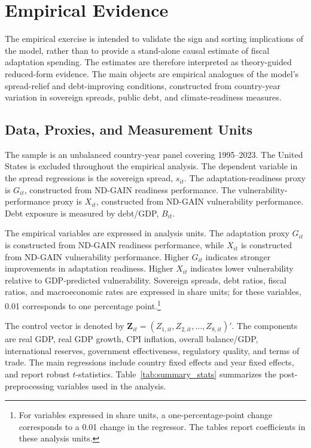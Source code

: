 \section{Empirical Evidence}
\label{sec:empirical}

The empirical exercise is intended to validate the sign and sorting implications of the model, rather than to provide a stand-alone causal estimate of fiscal adaptation spending. The estimates are therefore interpreted as theory-guided reduced-form evidence. The main objects are empirical analogues of the model's spread-relief and debt-improving conditions, constructed from country-year variation in sovereign spreads, public debt, and climate-readiness measures.

\subsection{Data, Proxies, and Measurement Units}

The sample is an unbalanced country-year panel covering 1995--2023. The United States is excluded throughout the empirical analysis. The dependent variable in the spread regressions is the sovereign spread, $s_{it}$. The adaptation-readiness proxy is $G_{it}$, constructed from ND-GAIN readiness performance. The vulnerability-performance proxy is $X_{it}$, constructed from ND-GAIN vulnerability performance. Debt exposure is measured by debt/GDP, $B_{it}$.

The empirical variables are expressed in analysis units. The adaptation proxy $G_{it}$ is constructed from ND-GAIN readiness performance, while $X_{it}$ is constructed from ND-GAIN vulnerability performance. Higher $G_{it}$ indicates stronger improvements in adaptation readiness. Higher $X_{it}$ indicates lower vulnerability relative to GDP-predicted vulnerability. Sovereign spreads, debt ratios, fiscal ratios, and macroeconomic rates are expressed in share units; for these variables, 0.01 corresponds to one percentage point.\footnote{For variables expressed in share units, a one-percentage-point change corresponds to a 0.01 change in the regressor. The tables report coefficients in these analysis units.}

The control vector is denoted by $\mathbf{Z}_{it}=(Z_{1,it},Z_{2,it},\ldots,Z_{8,it})'$. The components are real GDP, real GDP growth, CPI inflation, overall balance/GDP, international reserves, government effectiveness, regulatory quality, and terms of trade. The main regressions include country fixed effects and year fixed effects, and report robust $t$-statistics. Table~\ref{tab:summary_stats} summarizes the post-preprocessing variables used in the analysis.

